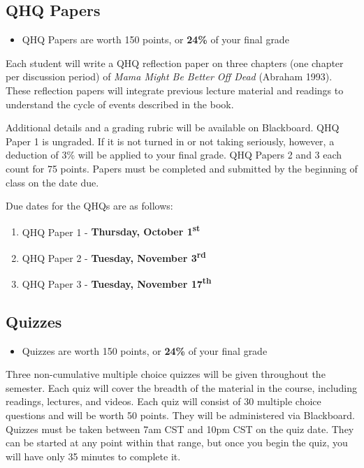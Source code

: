 \documentclass[
]{book}
\providecommand{\tightlist}{%
  \setlength{\itemsep}{0pt}\setlength{\parskip}{0pt}}
\newenvironment{rmdblock}[1]
  {\begin{shaded*}
  \begin{itemize}
  \renewcommand{\labelitemi}{
    \raisebox{-.7\height}[0pt][0pt]{
      {\setkeys{Gin}{width=3em,keepaspectratio}\texttt{[image: images/\#1]}}
    }
  }
  \item
  }
  {
  \end{itemize}
  \end{shaded*}
  }
\newenvironment{rmdtip}
  {\begin{rmdblock}{tip}}
  {\end{rmdblock}}
\begin{document}
\hypertarget{qhq-papers}{%
\subsection{QHQ Papers}\label{qhq-papers}}

\begin{rmdtip}
QHQ Papers are worth 150 points, or \textbf{24\%} of your final grade
\end{rmdtip}

Each student will write a QHQ reflection paper on three chapters (one chapter per discussion period) of \emph{Mama Might Be Better Off Dead} (Abraham 1993). These reflection papers will integrate previous lecture material and readings to understand the cycle of events described in the book.

Additional details and a grading rubric will be available on Blackboard. QHQ Paper 1 is ungraded. If it is not turned in or not taking seriously, however, a deduction of 3\% will be applied to your final grade. QHQ Papers 2 and 3 each count for 75 points. Papers must be completed and submitted by the beginning of class on the date due.

Due dates for the QHQs are as follows:

\begin{enumerate}
\def\labelenumi{\arabic{enumi}.}
\tightlist
\item
  QHQ Paper 1 - \textbf{Thursday, October 1\textsuperscript{st}}
\item
  QHQ Paper 2 - \textbf{Tuesday, November 3\textsuperscript{rd}}
\item
  QHQ Paper 3 - \textbf{Tuesday, November 17\textsuperscript{th}}
\end{enumerate}

\hypertarget{quizzes}{%
\subsection{Quizzes}\label{quizzes}}

\begin{rmdtip}
Quizzes are worth 150 points, or \textbf{24\%} of your final grade
\end{rmdtip}

Three non-cumulative multiple choice quizzes will be given throughout the semester. Each quiz will cover the breadth of the material in the course, including readings, lectures, and videos. Each quiz will consist of 30 multiple choice questions and will be worth 50 points. They will be administered via Blackboard. Quizzes must be taken between 7am CST and 10pm CST on the quiz date. They can be started at any point within that range, but once you begin the quiz, you will have only 35 minutes to complete it.
\end{document}
